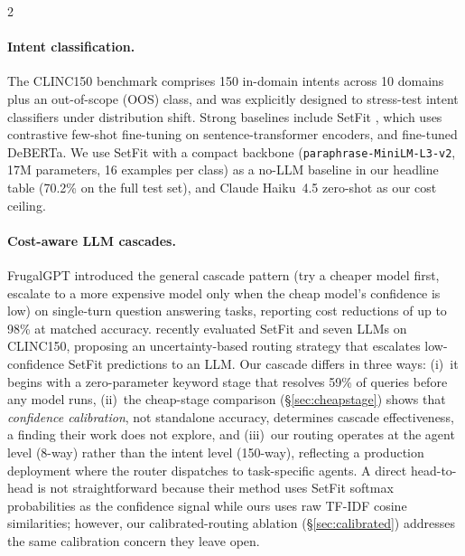 \documentclass[11pt,a4paper]{article}
\begin{document}
\begin{multicols}{2}
\paragraph{Intent classification.}
The CLINC150 benchmark \citep{larson2019evaluation} comprises 150 in-domain intents across 10 domains plus an out-of-scope (OOS) class, and was explicitly designed to stress-test intent classifiers under distribution shift. Strong baselines include SetFit \citep{tunstall2022efficient}, which uses contrastive few-shot fine-tuning on sentence-transformer encoders, and fine-tuned DeBERTa. We use SetFit with a compact backbone (\texttt{paraphrase-MiniLM-L3-v2}, 17M parameters, 16 examples per class) as a no-LLM baseline in our headline table (70.2\% on the full test set), and Claude Haiku~4.5 zero-shot as our cost ceiling.

\paragraph{Cost-aware LLM cascades.}
FrugalGPT \citep{chen2023frugalgpt} introduced the general cascade pattern (try a cheaper model first, escalate to a more expensive model only when the cheap model's confidence is low) on single-turn question answering tasks, reporting cost reductions of up to 98\% at matched accuracy. \citet{arora2024intent} recently evaluated SetFit and seven LLMs on CLINC150, proposing an uncertainty-based routing strategy that escalates low-confidence SetFit predictions to an LLM. Our cascade differs in three ways: (i)~it begins with a zero-parameter keyword stage that resolves 59\% of queries before any model runs, (ii)~the cheap-stage comparison (\S\ref{sec:cheapstage}) shows that \emph{confidence calibration}, not standalone accuracy, determines cascade effectiveness, a finding their work does not explore, and (iii)~our routing operates at the agent level (8-way) rather than the intent level (150-way), reflecting a production deployment where the router dispatches to task-specific agents. A direct head-to-head is not straightforward because their method uses SetFit softmax probabilities as the confidence signal while ours uses raw TF-IDF cosine similarities; however, our calibrated-routing ablation (\S\ref{sec:calibrated}) addresses the same calibration concern they leave open.


\end{multicols}
\end{document}
